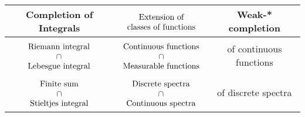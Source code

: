 \documentclass[12pt,b5paper,notitlepage]{article}
\theoremstyle{definition}
\theoremstyle{plain}
\numberwithin{equation}{section}
\begin{document}
\begin{table}[H]
\centering
 \begin{tabular}{|c|c|c|}
    \hline 
Completion of Integrals &$\begin{array}{c}
\rule{0pt}{0.45cm}\text{Extension of} \\
\text{classes of functions}
\end{array}$  & \textbf{Weak-* completion}\\
\hline 
$\begin{array}{c}
\rule{0pt}{0.45cm}\text{Riemann integral} \\
\cap\\
\text{Lebesgue integral}
\end{array}$
& 
$\begin{array}{c}
\rule{0pt}{0.45cm}\text{Continuous functions} \\
\cap\\
\text{Measurable functions}
\end{array}$
 & of continuous functions\\
\hline 
$\begin{array}{c}
\rule{0pt}{0.45cm}\text{Finite sum} \\
\cap\\
\text{Stieltjes integral}
\end{array}$
& 
$\begin{array}{c}
\rule{0pt}{0.45cm}\text{Discrete spectra} \\
\cap\\
\text{Continuous spectra}
\end{array}$
 & of discrete spectra\\
\hline
  \end{tabular}
\caption{}\label{tb3}
\end{table}
\end{document}
